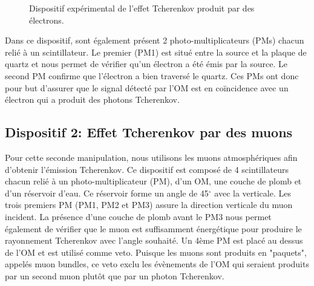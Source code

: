 \begin{figure}[!h]
    \caption{\label{fig:dispo1} Dispositif expérimental de l'effet Tcherenkov produit par des électrons.}
\end{figure}

Dans ce dispositif, sont également présent 2 photo-multiplicateurs (PMs) chacun relié à un scintillateur. Le premier (PM1) est situé entre la source et la plaque de quartz et nous permet de vérifier qu'un électron a été émis par la source. Le second PM confirme que l'électron a bien traversé le quartz. Ces PMs ont donc pour but d'assurer que le signal détecté par l'OM est en coïncidence avec un électron qui a produit des photons Tcherenkov.

\subsection{Dispositif 2: Effet Tcherenkov par des muons}

Pour cette seconde manipulation, nous utilisons les muons atmosphériques afin d'obtenir l'émission Tcherenkov. Ce dispositif est composé de 4 scintillateurs chacun relié à un photo-multiplicateur (PM), d'un OM, une couche de plomb et d'un réservoir d'eau. Ce réservoir forme un angle de 45$^{\circ}$ avec la verticale. Les trois premiers PM (PM1, PM2 et PM3) assure la direction verticale du muon incident. La présence d'une couche de plomb avant le PM3 nous permet également de vérifier que le muon est suffisamment énergétique pour produire le rayonnement Tcherenkov avec l'angle souhaité. Un 4ème PM est placé au dessus de l'OM et est utilisé comme veto. Puisque les muons sont produits en "paquets", appelés muon bundles, ce veto exclu les évènements de l'OM qui seraient produits par un second muon plutôt que par un photon Tcherenkov.



